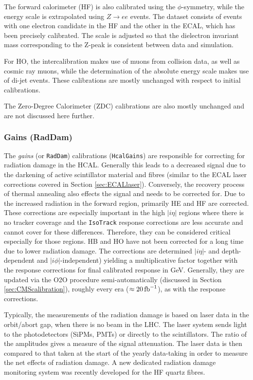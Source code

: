 The forward calorimeter (HF) is also calibrated using the $\phi$-symmetry, while the energy scale is extrapolated using $Z \rightarrow ee$ events. The dataset consists of events with one electron candidate in the HF and the other in the ECAL, which has been precisely calibrated. The scale is adjusted so that the dielectron invariant mass corresponding to the Z-peak is consistent between data and simulation.

For HO, the intercalibration makes use of muons from collision data, as well as cosmic ray muons, while the determination of the absolute energy scale makes use of di-jet events. These calibrations are mostly unchanged with respect to initial calibrations.

The Zero-Degree Calorimeter (ZDC) calibrations are also mostly unchanged and are not discussed here further. 

\subsubsection{Gains (RadDam)}\label{sec:HCAL_gains}
The \textit{gains} (or \texttt{RadDam}) calibrations (\texttt{HcalGains}) are responsible for correcting for radiation damage in the HCAL. Generally this leads to a decreased signal due to the darkening of active scintillator material and fibres (similar to the ECAL laser corrections covered in Section \ref{sec:ECALlaser}). Conversely, the recovery process of thermal annealing also effects the signal and needs to be corrected for. Due to the increased radiation in the forward region, primarily HE and HF are corrected. These corrections are especially important in the high $|i\eta|$ regions where there is no tracker coverage and the \texttt{IsoTrack} response corrections are less accurate and cannot cover for these differences. Therefore, they can be considered critical especially for those regions. HB and HO have not been corrected for a long time due to lower radiation damage. The corrections are determined $|i\eta|$- and depth-dependent and $|i\phi|$-independent) yielding a multiplicative factor together with the response corrections for final calibrated response in GeV. Generally, they are updated via the O2O procedure semi-automatically (discussed in Section \ref{sec:CMScalibration}), roughly every era ($\approx 20 \mbox{\ensuremath{\,\text{fb}^{-1}}}$), as with the response corrections.

Typically, the measurements of the radiation damage is based on laser data in the orbit/abort gap, when there is no beam in the LHC. The laser system sends light to the photodetectors (SiPMs, PMTs) or directly to the scintillators. The ratio of the amplitudes gives a measure of the signal attenuation. The laser data is then compared to that taken at the start of the yearly data-taking in order to measure the net effects of radiation damage. A new dedicated radiation damage monitoring system was recently developed for the HF quartz fibres. 

